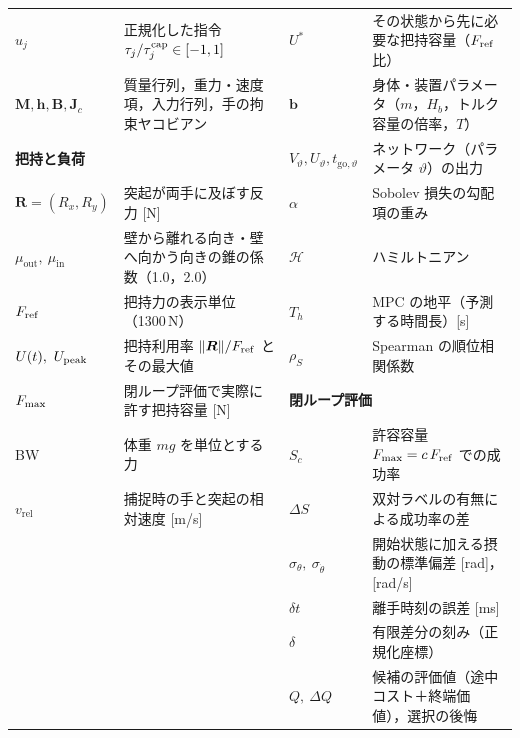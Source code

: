 \begin{table}[t]
\begin{tabular}{lp{}|lp{}}
$u_j$ & 正規化した指令 $\tau_j/\tau^{\mathrm{cap}}_j\in[-1,1]$ & $U^*$ & その状態から先に必要な把持容量（$F_{\mathrm{ref}}$ 比） \\
$\bm M,\bm h,\bm B,\bm J_c$ & 質量行列，重力・速度項，入力行列，手の拘束ヤコビアン & $\bm b$ & 身体・装置パラメータ（$m$，$H_b$，トルク容量の倍率，$T$） \\
\multicolumn{2}{l|}{\textbf{把持と負荷}} & $V_\vartheta,U_\vartheta,t_{\mathrm{go},\vartheta}$ & ネットワーク（パラメータ $\vartheta$）の出力 \\
$\bm R=(R_x,R_y)$ & 突起が両手に及ぼす反力 [N] & $\alpha$ & Sobolev 損失の勾配項の重み \\
$\mu_{\mathrm{out}},\ \mu_{\mathrm{in}}$ & 壁から離れる向き・壁へ向かう向きの錐の係数（1.0，2.0） & $\mathcal H$ & ハミルトニアン \\
$F_{\mathrm{ref}}$ & 把持力の表示単位（1300\,N） & $T_h$ & MPC の地平（予測する時間長）[s] \\
$U(t),\ \Upk$ & 把持利用率 $\|\bm R\|/F_{\mathrm{ref}}$ とその最大値 & $\rho_S$ & Spearman の順位相関係数 \\
$F_{\max}$ & 閉ループ評価で実際に許す把持容量 [N] & \multicolumn{2}{l}{\textbf{閉ループ評価}} \\
BW & 体重 $mg$ を単位とする力 & $S_{c}$ & 許容容量 $F_{\max}=c\,F_{\mathrm{ref}}$ での成功率 \\
$v_{\mathrm{rel}}$ & 捕捉時の手と突起の相対速度 [m/s] & $\Delta S$ & 双対ラベルの有無による成功率の差 \\
 & & $\sigma_\theta,\ \sigma_{\dot\theta}$ & 開始状態に加える摂動の標準偏差 [rad]，[rad/s] \\
 & & $\delta t$ & 離手時刻の誤差 [ms] \\
 & & $\delta$ & 有限差分の刻み（正規化座標） \\
 & & $Q,\ \Delta Q$ & 候補の評価値（途中コスト＋終端価値），選択の後悔 \\
\bottomrule
\end{tabular}
\end{table}
